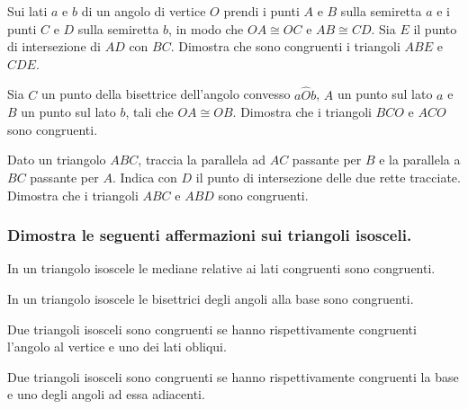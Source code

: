 \begin{multicols}{2}
\begin{esercizio}
\label{ese:2.24}
Sui lati $a$ e $b$ di un angolo di vertice $O$ prendi i punti $A$ e $B$ sulla semiretta $a$ e i punti $C$ e $D$ sulla semiretta $b$, in modo che $OA\cong OC$ e $AB\cong CD$. Sia $E$ il punto di intersezione di $AD$ con $BC$. Dimostra che sono congruenti i triangoli $ABE$ e $CDE$.
\end{esercizio}

\begin{esercizio}
\label{ese:2.25}
Sia $C$ un punto della bisettrice dell'angolo convesso $a\widehat{O}b$, $A$ un punto sul lato $a$ e $B$ un punto sul lato $b$, tali che $OA\cong OB$. Dimostra che i triangoli $BCO$ e $ACO$ sono congruenti.
\end{esercizio}

\begin{esercizio}
\label{ese:2.26}
Dato un triangolo $ABC$, traccia la parallela ad $AC$ passante per $B$ e la parallela a $BC$ passante per $A$. Indica con $D$ il punto di intersezione delle due rette tracciate. Dimostra che i triangoli $ABC$ e $ABD$ sono congruenti.
\end{esercizio}

\subsubsection*{Dimostra le seguenti affermazioni sui triangoli isosceli.}

\begin{esercizio}
\label{ese:2.27}
In un triangolo isoscele le mediane relative ai lati congruenti sono congruenti. 
\end{esercizio}

\begin{esercizio}
\label{ese:2.28}
In un triangolo isoscele le bisettrici degli angoli alla base sono congruenti. 
\end{esercizio}

\begin{esercizio}
\label{ese:2.29}
Due triangoli isosceli sono congruenti se hanno rispettivamente congruenti l'angolo al vertice e uno dei lati obliqui.
\end{esercizio}

\begin{esercizio}
\label{ese:2.30}
Due triangoli isosceli sono congruenti se hanno rispettivamente congruenti la base e uno degli angoli ad essa adiacenti.
\end{esercizio}


\end{multicols}
